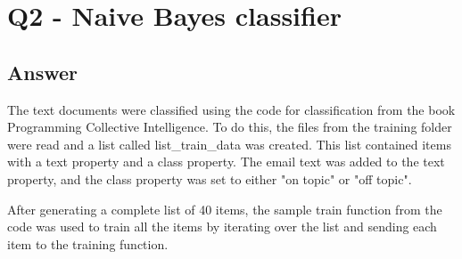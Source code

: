 \documentclass[12pt]{article}
\begin{document}
\section*{Q2 - Naive Bayes classifier}

\subsection*{Answer}
The text documents were classified using the code for classification from the book Programming Collective Intelligence. To do this, the files from the training folder were read and a list called list\_train\_data was created. This list contained items with a text property and a class property. The email text was added to the text property, and the class property was set to either "on topic" or "off topic".

After generating a complete list of 40 items, the sample train function from the code was used to train all the items by iterating over the list and sending each item to the training function.
\end{document}
